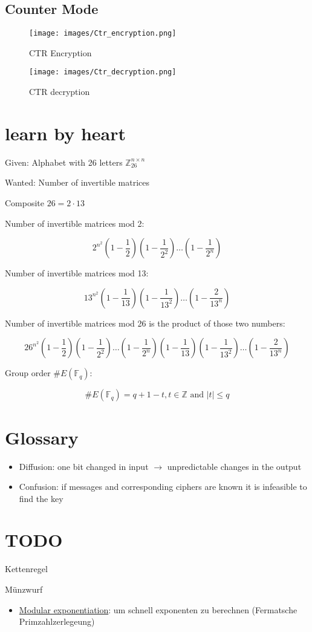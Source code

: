 \documentclass[a4paper]{article}
\begin{document}
\subsection{Counter Mode}

\begin{figure}[!ht]
	\begin{center}
		\texttt{[image: images/Ctr\_encryption.png]}
	\end{center}
	\caption{CTR Encryption}
	\label{fig:ctr_en}
\end{figure}
\begin{figure}[!ht]
	\begin{center}
		\texttt{[image: images/Ctr\_decryption.png]}
	\end{center}
	\caption{CTR decryption}
	\label{fig:ctr_de}
\end{figure}

\section{learn by heart}
Given: Alphabet with 26 letters $\mathbb{Z}^{n \times n}_26$

Wanted: Number of invertible matrices


Composite $26 = 2 \cdot 13$


Number of invertible matrices mod 2:


\[2^{n^2} (1 - \frac{1}{2}) (1- \frac{1}{2^2})\dots(1-\frac{1}{2^n})\]


Number of invertible matrices mod 13:


\[13^{n^2} (1 - \frac{1}{13}) (1- \frac{1}{13^2})\dots(1-\frac{2}{13^n})\]


Number of invertible matrices mod 26 is the product of those two numbers:


\[26^{n^2} (1 - \frac{1}{2}) (1- \frac{1}{2^2})\dots(1-\frac{1}{2^n})(1 - \frac{1}{13}) (1- \frac{1}{13^2})\dots(1-\frac{2}{13^n})\]

Group order \#$E(\mathbb{F}_q)$:

\[\text{\#}E(\mathbb{F}_q) = q + 1 -t, t \in \mathbb{Z} \text{ and } |t| \leq q \]

\section{Glossary}
\begin{itemize}
    \item Diffusion: one bit changed in input $\rightarrow$ unpredictable changes in the output
    \item Confusion: if messages and corresponding ciphers are known it is infeasible to find the key
\end{itemize}

\section{TODO}
Kettenregel


Münzwurf


\begin{itemize}
    \item \href{http://en.wikipedia.org/wiki/Modular_exponentiation}{Modular exponentiation}: um schnell exponenten zu berechnen (Fermatsche Primzahlzerlegeung) 
\end{itemize}
\end{document}
